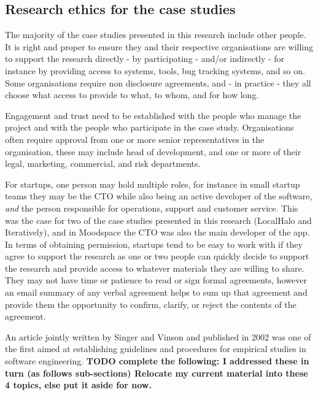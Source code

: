 \subsection{Research ethics for the case studies}
\label{section-research-ethics-for-the-case-studies}

The majority of the case studies presented in this research include other people. It is right and proper to ensure they and their respective organisations are willing to support the research directly - by participating - and/or indirectly - for instance by providing access to systems, tools, bug tracking systems, and so on. Some organisations require non disclosure agreements, and - in practice - they all choose what access to provide to what, to whom, and for how long. 

Engagement and trust need to be established with the people who manage the project and with the people who participate in the case study. Organisations often require approval from one or more senior representatives in the organisation, these may include head of development, and one or more of their legal, marketing, commercial, and risk departments.

For startups, one person may hold multiple roles, for instance in small startup teams they may be the CTO while also being an active developer of the software, \emph{and} the person responsible for operations, support and customer service. This was the case for two of the case studies presented in this research (LocalHalo and Iteratively), and in Moodspace the CTO was also the main developer of the app. In terms of obtaining permission, startups tend to be easy to work with if they agree to support the research as one or two people can quickly decide to support the research and provide access to whatever materials they are willing to share. They may not have time or patience to read or sign formal agreements, however an email summary of any verbal agreement helps to sum up that agreement and provide them the opportunity to confirm, clarify, or reject the contents of the agreement.



An article jointly written by Singer and Vinson and published in 2002 was one of the first aimed at establishing guidelines and procedures for empirical studies in software engineering. \textbf{TODO complete the following: I addressed these in turn (as follows sub-sections) Relocate my current material into these 4 topics, else put it aside for now.} 

